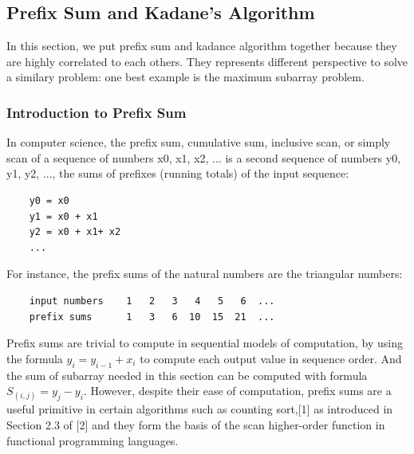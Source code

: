 \documentclass[../specific-algorithms.tex]{subfiles}
\begin{document}
\subsection{Prefix Sum and Kadane's Algorithm}
\label{part4_prefix_sum}
In this section, we put prefix sum and kadance algorithm together because they are highly correlated to each others. They represents different perspective to solve a similary problem: one best example is the maximum subarray problem. 
\subsubsection{Introduction to Prefix Sum}
In computer science, the prefix sum, cumulative sum, inclusive scan, or simply scan of a sequence of numbers x0, x1, x2, ... is a second sequence of numbers y0, y1, y2, ..., the sums of prefixes (running totals) of the input sequence:
\begin{lstlisting}
    y0 = x0
    y1 = x0 + x1
    y2 = x0 + x1+ x2
    ...
\end{lstlisting}

For instance, the prefix sums of the natural numbers are the triangular numbers:
\begin{lstlisting}
    input numbers 	 1 	 2 	 3 	 4 	 5 	 6 	...
    prefix sums 	 1 	 3 	 6 	10 	15 	21 	... 
\end{lstlisting}

Prefix sums are trivial to compute in sequential models of computation, by using the formula $y_i = y_{i-1} + x_i$ to compute each output value in sequence order. And the sum of subarray needed in this section can be computed with formula $S_{(i,j)} = y_j-y_i$. However, despite their ease of computation, prefix sums are a useful primitive in certain algorithms such as counting sort,[1] as introduced in Section 2.3 of [2] and they form the basis of the scan higher-order function in functional programming languages.
\end{document}

